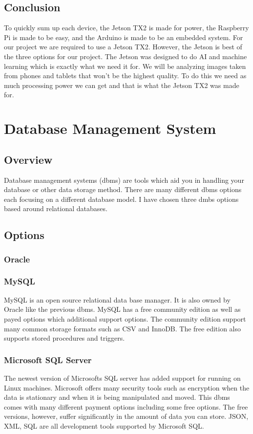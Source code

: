 \documentclass[onecolumn, draftclsnofoot,10pt, compsoc]{IEEEtran}
\begin{document}
	\subsection{Conclusion}
		To quickly sum up each device, the Jetson TX2 is made for power, the Raspberry Pi is made to be easy, and the Arduino is made to be an embedded system.
		For our project we are required to use a Jetson TX2.
		However, the Jetson is best of the three options for our project.
		The Jetson was designed to do AI and machine learning which is exactly what we need it for.
		We will be analyzing images taken from phones and tablets that won't be the highest quality.
		To do this we need as much processing power we can get and that is what the Jetson TX2 was made for.

\section{Database Management System}
	\subsection{Overview}
		Database management systems (dbms) are tools which aid you in handling your database or other data storage method.
		There are many different dbms options each focusing on a different database model.
		I have chosen three dmbs options based around relational databases.

	\subsection{Options}
		\subsubsection{Oracle}
			

		\subsubsection{MySQL}
			MySQL is an open source relational data base manager.
			It is also owned by Oracle like the previous dbms.
			MySQL has a free community edition as well as payed options which additional support options\cite{mysql_products}.
			The community edition support many common storage formats such as CSV and InnoDB.
			The free edition also supports stored procedures and triggers\cite{mysql_community}.

		\subsubsection{Microsoft SQL Server}
			The newest version of Microsofts SQL server has added support for running on Linux machines.
			Microsoft offers many security tools such as encryption when the data is stationary and when it is being manipulated and moved\cite{microsoft_comparison}.
			This dbms comes with many different payment options including some free options.
			The free versions, however, suffer significantly in the amount of data you can store.
			JSON, XML, SQL are all development tools supported by Microsoft SQL\cite{microsoft_editions}.
\end{document}
